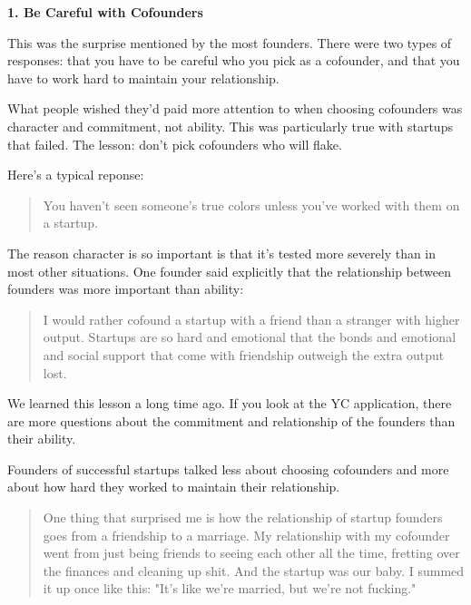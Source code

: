                   \textbf{1. Be Careful with Cofounders}

This was the
                  surprise mentioned by the most founders. There were two types
                  of responses: that you have to be careful who you pick as a
                  cofounder, and that you have to work hard to maintain your
                  relationship.

What people wished they'd paid more
                  attention to when choosing cofounders was character and
                  commitment, not ability. This was particularly true with
                  startups that failed. The lesson: don't pick cofounders who
                  will flake.

Here's a typical reponse:
                  \begin{quote}

                    You haven't seen someone's true colors unless you've worked
                    with them on a startup.
                  
\end{quote}

                  The reason character is so important is that it's tested more
                  severely than in most other situations. One founder said
                  explicitly that the relationship between founders was more
                  important than ability:
                  \begin{quote}

                    I would rather cofound a startup with a friend than a
                    stranger with higher output. Startups are so hard and
                    emotional that the bonds and emotional and social support
                    that come with friendship outweigh the extra output lost.
                  
\end{quote}

                  We learned this lesson a long time ago. If you look at the YC
                  application, there are more questions about the commitment and
                  relationship of the founders than their ability.

Founders
                  of successful startups talked less about choosing cofounders
                  and more about how hard they worked to maintain their
                  relationship.
                  \begin{quote}

                    One thing that surprised me is how the relationship of
                    startup founders goes from a friendship to a marriage. My
                    relationship with my cofounder went from just being friends
                    to seeing each other all the time, fretting over the
                    finances and cleaning up shit. And the startup was our baby.
                    I summed it up once like this: "It's like we're married, but
                    we're not fucking."
                  
\end{quote}

